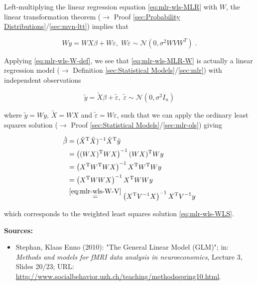 \documentclass[a4paper,12pt,twoside]{book}
\begin{document}
Left-multiplying the linear regression equation \eqref{eq:mlr-wls-MLR} with $W$, the linear transformation theorem ($\rightarrow$ Proof \ref{sec:Probability Distributions}/\ref{sec:mvn-ltt}) implies that

\begin{equation} \label{eq:mlr-wls-MLR-W}
Wy = WX\beta + W\varepsilon, \; W\varepsilon \sim \mathcal{N}(0, \sigma^2 W V W^T) \; .
\end{equation}

Applying \eqref{eq:mlr-wls-W-def}, we see that \eqref{eq:mlr-wls-MLR-W} is actually a linear regression model ($\rightarrow$ Definition \ref{sec:Statistical Models}/\ref{sec:mlr}) with independent observations

\begin{equation} \label{eq:mlr-wls-MLR-W-dev}
\tilde{y} = \tilde{X}\beta + \tilde{\varepsilon}, \; \tilde{\varepsilon} \sim \mathcal{N}(0, \sigma^2 I_n)
\end{equation}

where $\tilde{y} = Wy$, $\tilde{X} = WX$ and $\tilde{\varepsilon} = W\varepsilon$, such that we can apply the ordinary least squares solution ($\rightarrow$ Proof \ref{sec:Statistical Models}/\ref{sec:mlr-ols}) giving

\begin{equation} \label{eq:mlr-wls-WLS-qed}
\begin{split}
\hat{\beta} &= (\tilde{X}^\mathrm{T} \tilde{X})^{-1} \tilde{X}^\mathrm{T} \tilde{y} \\
&= \left( (WX)^\mathrm{T} WX \right)^{-1} (WX)^\mathrm{T} Wy \\
&= \left( X^\mathrm{T} W^\mathrm{T} W X \right)^{-1} X^\mathrm{T} W^\mathrm{T} W y \\
&= \left( X^\mathrm{T} W W X \right)^{-1} X^\mathrm{T} W W y \\
&\overset{\eqref{eq:mlr-wls-W-V}}{=} \left( X^\mathrm{T} V^{-1} X \right)^{-1} X^\mathrm{T} V^{-1} y
\end{split}
\end{equation}

which corresponds to the weighted least squares solution \eqref{eq:mlr-wls-WLS}.


\vspace{1em}
\textbf{Sources:}
\begin{itemize}
\item Stephan, Klaas Enno (2010): "The General Linear Model (GLM)"; in: \textit{Methods and models for fMRI data analysis in neuroeconomics}, Lecture 3, Slides 20/23; URL: \url{http://www.socialbehavior.uzh.ch/teaching/methodsspring10.html}.
\end{itemize}
\end{document}

